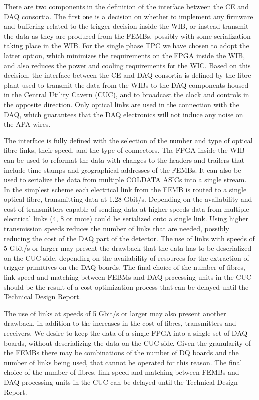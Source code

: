 There are two components in the definition of the interface between the CE
and DAQ consortia. The first one is a decision on whether to implement any
firmware and buffering related to the trigger decision inside the WIB, or
instead transmit the data as they are produced from the FEMBs, possibly with
some serialization taking place in the WIB. For the single phase TPC we have
chosen to adopt the latter option, which minimizes the requirements on the
FPGA inside the WIB, and also reduces the power and cooling requirements for the WIC.
Based on this decision, the interface between the CE and DAQ consortia is
defined by the fibre plant
used to transmit the data from the WIBs to the DAQ components housed in the
Central Utility Cavern (CUC), and to broadcast the clock and controls in the
opposite direction. Only optical links are used in the connection with the DAQ,
which guarantees that the DAQ electronics will not induce any noise on the
APA wires.

The interface is fully defined with the selection of the number
and type of optical fibre links, their speed, and the type of connectors.
The FPGA inside the WIB can be used to reformat the data with changes to
the headers and trailers that include time stamps and geographical addresses
of the FEMBs. It can also be used to serialize the data from multiple
COLDATA ASICs into a single stream. In the simplest scheme each electrical
link from the FEMB is routed to a single optical fibre, transmitting data
at 1.28 Gbit/s. Depending on the availability and cost of transmitters
capable of sending data at higher speeds data from multiple electrical
links (4, 8 or more) could be serialized onto a single link. Using higher transmission
speeds reduces the number of links that are needed, possibly reducing the
cost of the DAQ part of the detector. The use of links with speeds
of 5 Gbit/s or larger may present the
drawback that the data has to be deserialized on the CUC side, depending
on the availability of resources for the extraction of trigger primitives
on the DAQ boards. The final choice of the number of fibres, link speed and
matching between FEBMs and DAQ processing units in the CUC should be
the result of a cost optimization process that can be delayed until
the Technical Design Report.

The use of links at speeds of 5 Gbit/s
or larger may also present another drawback, in addition to the increases
in the cost of fibres, transmitters and receivers. We desire to keep the
data of a single FPGA into a single set of DAQ boards, without deserializing
the data on the CUC side. Given the granularity of the FEMBs there may be
combinations of the number of DQ boards and the number of links being
used, that cannot be operated for this reason. The final choice of the
number of fibres, link speed and matching between FEMBs and DAQ processing
units in the CUC can be delayed until the Technical Design Report.

